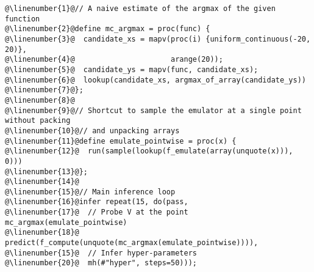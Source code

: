\begin{mdframed}
\begin{minipage}{\linewidth}
\small
\belowcaptionskip=-10pt
\begin{lstlisting}[caption={Bayesian optimization with uniformly distributed
proposals},mathescape,numbers=none,label=alg:uniform_bayesopt,escapechar=\@]
@\linenumber{1}@// A naive estimate of the argmax of the given function
@\linenumber{2}@define mc_argmax = proc(func) {
@\linenumber{3}@  candidate_xs = mapv(proc(i) {uniform_continuous(-20, 20)},
@\linenumber{4}@                      arange(20));
@\linenumber{5}@  candidate_ys = mapv(func, candidate_xs);
@\linenumber{6}@  lookup(candidate_xs, argmax_of_array(candidate_ys))
@\linenumber{7}@};
@\linenumber{8}@
@\linenumber{9}@// Shortcut to sample the emulator at a single point without packing
@\linenumber{10}@// and unpacking arrays
@\linenumber{11}@define emulate_pointwise = proc(x) {
@\linenumber{12}@  run(sample(lookup(f_emulate(array(unquote(x))), 0)))
@\linenumber{13}@};
@\linenumber{14}@
@\linenumber{15}@// Main inference loop
@\linenumber{16}@infer repeat(15, do(pass,
@\linenumber{17}@  // Probe V at the point mc_argmax(emulate_pointwise)
@\linenumber{18}@  predict(f_compute(unquote(mc_argmax(emulate_pointwise)))),
@\linenumber{15}@  // Infer hyper-parameters
@\linenumber{20}@  mh(#"hyper", steps=50)));
\end{lstlisting}

\end{minipage}
\end{mdframed}
